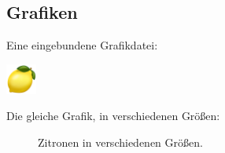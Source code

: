\subsection*{Grafiken}
Eine eingebundene Grafikdatei:
\begin{center}
  \includegraphics[keepaspectratio,width=1cm]{lemon.png}
\end{center}
\newpage
Die gleiche Grafik, in verschiedenen Größen:
\begin{figure}[h]
  \begin{center}
  \caption{Zitronen in verschiedenen Größen.}
  \end{center}
\end{figure}

